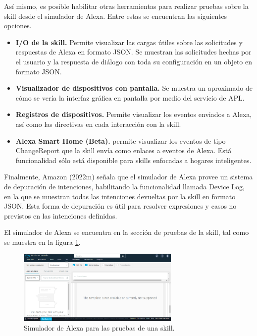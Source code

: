 Así mismo, es posible habilitar otras herramientas para realizar pruebas sobre la skill desde el simulador de Alexa. Entre estas se encuentran las siguientes opciones.

\begin{itemize}
  \item \textbf{I/O de la skill.} Permite visualizar las cargas útiles sobre las solicitudes y respuestas de Alexa en formato JSON. Se muestran las solicitudes hechas por el usuario y la respuesta de diálogo con toda su configuración en un objeto en formato JSON.
  \item \textbf{Visualizador de dispositivos con pantalla.} Se muestra un aproximado de cómo se vería la interfaz gráfica en pantalla por medio del servicio de APL.
  \item \textbf{Registros de dispositivos.} Permite visualizar los eventos enviados a Alexa, así como las directivas en cada interacción con la skill.
  \item \textbf{Alexa Smart Home (Beta).} permite visualizar los eventos de tipo ChangeReport que la skill envía como enlaces a eventos de Alexa. Está funcionalidad sólo está disponible para skills enfocadas a hogares inteligentes.
\end{itemize}

Finalmente, Amazon (2022m) señala que el simulador de Alexa provee un sistema de depuración de intenciones, habilitando la funcionalidad llamada Device Log, en la que se muestran todas las intenciones devueltas por la skill en formato JSON. Esta forma de depuración es útil para resolver expresiones y casos no previstos en las intenciones definidas.

El simulador de Alexa se encuentra en la sección de pruebas de la skill, tal como se muestra en la figura \ref{fig:412}.

\begin{figure}
  \centering
  \includegraphics[width=0.70\textwidth]{Cap4/Figuras/Simulador.png}
  \caption{Simulador de Alexa para las pruebas de una skill.}
  \label{fig:412}
\end{figure}

